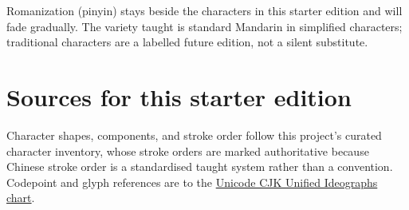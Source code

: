 \documentclass[11pt,twoside]{book}
\begin{document}
Romanization (pinyin) stays beside the characters in this starter edition and
will fade gradually. The variety taught is standard Mandarin in simplified
characters; traditional characters are a labelled future edition, not a silent
substitute.

\tableofcontents

\mainmatter






















\backmatter





\chapter*{Sources for this starter edition}

Character shapes, components, and stroke order follow this project's curated
character inventory, whose stroke orders are marked authoritative because Chinese
stroke order is a standardised taught system rather than a convention. Codepoint and glyph references are to the
\href{https://www.unicode.org/charts/PDF/U4E00.pdf}{Unicode CJK Unified
Ideographs chart}.


\end{document}
